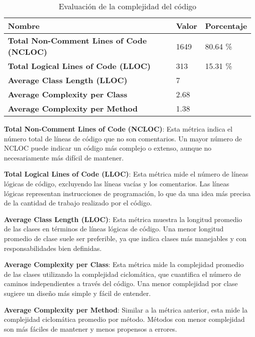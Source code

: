 \begin{table}[h]
    \renewcommand{\arraystretch}{1.5}
    \setlength{\tabcolsep}{10pt}
    \begin{tabular}{>{\bfseries}p{} p{} p{}}
        \toprule
        \textbf{Nombre}                         & \textbf{Valor} & \textbf{Porcentaje} \\
        \midrule
        Total Non-Comment Lines of Code (NCLOC) & 1649           & 80.64 \%            \\
        Total Logical Lines of Code (LLOC)      & 313            & 15.31 \%            \\
        Average Class Length (LLOC)             & 7              &                     \\
        Average Complexity per Class            & 2.68           &                     \\
        Average Complexity per Method           & 1.38           &                     \\
        \bottomrule
    \end{tabular}
    \caption{Evaluación de la complejidad del código}
    \label{tab:phploc_report}
\end{table}

\textbf{Total Non-Comment Lines of Code (NCLOC)}:
Esta métrica indica el número total de líneas de código que no son comentarios.
Un mayor número de NCLOC puede indicar un código más complejo o extenso, aunque no necesariamente más difícil de
mantener.

\textbf{Total Logical Lines of Code (LLOC)}:
Esta métrica mide el número de líneas lógicas de código, excluyendo las líneas vacías y los comentarios.
Las líneas lógicas representan instrucciones de programación, lo que da una idea más precisa de la cantidad de trabajo
realizado por el código.

\textbf{Average Class Length (LLOC)}:
Esta métrica muestra la longitud promedio de las clases en términos de líneas lógicas de código.
Una menor longitud promedio de clase suele ser preferible, ya que indica clases más manejables y con responsabilidades
bien definidas.

\textbf{Average Complexity per Class}:
Esta métrica mide la complejidad promedio de las clases utilizando la complejidad ciclomática, que cuantifica el
número de caminos independientes a través del código.
Una menor complejidad por clase sugiere un diseño más simple y fácil de entender.

\textbf{Average Complexity per Method}:
Similar a la métrica anterior, esta mide la complejidad ciclomática promedio por método.
Métodos con menor complejidad son más fáciles de mantener y menos propensos a errores.

